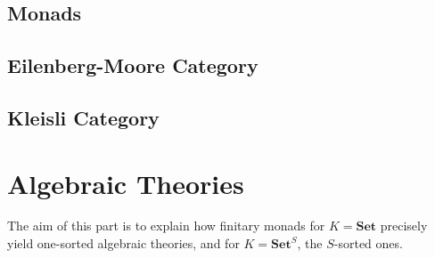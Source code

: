 \documentclass{article}
\begin{document}
\subsection{Monads}


\subsection{Eilenberg-Moore Category}


\subsection{Kleisli Category}

\section{Algebraic Theories}
The aim of this part is to explain
how finitary monads for $K = \mathbf{Set}$ precisely yield one-sorted algebraic theories,
and for $K = \mathbf{Set}^S$, the $S$-sorted ones{\cite{ARV10}}.
\end{document}
